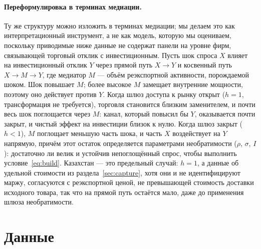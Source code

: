 \documentclass[12pt]{article}
\begin{document}
\paragraph{Переформулировка в терминах медиации.} Ту же структуру можно изложить в терминах
медиации; мы делаем это как интерпретационный инструмент, а не как модель, которую мы
оцениваем, поскольку приводимые ниже данные не содержат панели на уровне фирм, связывающей
торговый отклик с инвестиционным. Пусть шок спроса $X$ влияет на инвестиционный отклик $Y$
через прямой путь $X \to Y$ и косвенный путь $X \to M \to Y$, где медиатор $M$ — объём
реэкспортной активности, порождаемой шоком. Шок повышает $M$; более высокое $M$ замещает
внутренние мощности, поэтому оно действует против $Y$. Когда шлюз доступа к рынку открыт
($h = 1$, трансформация не требуется), торговля становится близким заменителем, и почти
весь шок поглощается через $M$: канал, который повысил бы $Y$, оказывается почти закрыт, и
чистый эффект на инвестиции близок к нулю. Когда шлюз закрыт ($h < 1$), $M$ поглощает
меньшую часть шока, и часть $X$ воздействует на $Y$ напрямую, причём этот остаток
определяется параметрами необратимости ($\rho$, $\sigma$, $I$): достаточно ли велик и
устойчив непоглощённый спрос, чтобы выполнить условие~\eqref{eq:build}. Казахстан — это
предельный случай: $h = 1$, а данные об удельной стоимости из раздела~\ref{sec:capture},
хотя они и не идентифицируют маржу, согласуются с реэкспортной ценой, не превышающей
стоимость доставки исходного товара, так что на прямой путь остаётся мало, даже до
применения шлюза необратимости.

\section{Данные}\label{sec:data}
\end{document}
